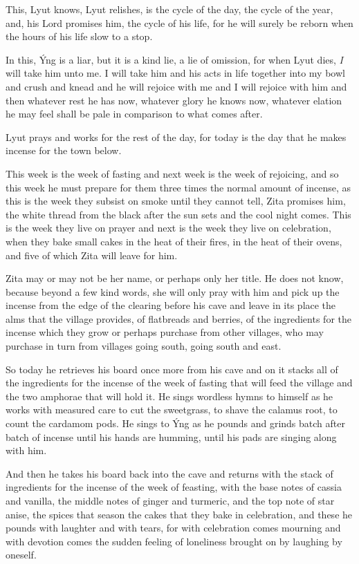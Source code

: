This, Lyut knows, Lyut relishes, is the cycle of the day, the cycle of the year, and, his Lord promises him, the cycle of his life, for he will surely be reborn when the hours of his life slow to a stop.

In this, Ýng is a liar, but it is a kind lie, a lie of omission, for when Lyut dies, \emph{I} will take him unto me. I will take him and his acts in life together into my bowl and crush and knead and he will rejoice with me and I will rejoice with him and then whatever rest he has now, whatever glory he knows now, whatever elation he may feel shall be pale in comparison to what comes after.

\secdiv

\noindent Lyut prays and works for the rest of the day, for today is the day that he makes incense for the town below.

This week is the week of fasting and next week is the week of rejoicing, and so this week he must prepare for them three times the normal amount of incense, as this is the week they subsist on smoke until they cannot tell, Zita promises him, the white thread from the black after the sun sets and the cool night comes. This is the week they live on prayer and next is the week they live on celebration, when they bake small cakes in the heat of their fires, in the heat of their ovens, and five of which Zita will leave for him.

Zita may or may not be her name, or perhaps only her title. He does not know, because beyond a few kind words, she will only pray with him and pick up the incense from the edge of the clearing before his cave and leave in its place the alms that the village provides, of flatbreads and berries, of the ingredients for the incense which they grow or perhaps purchase from other villages, who may purchase in turn from villages going south, going south and east.

So today he retrieves his board once more from his cave and on it stacks all of the ingredients for the incense of the week of fasting that will feed the village and the two amphorae that will hold it. He sings wordless hymns to himself as he works with measured care to cut the sweetgrass, to shave the calamus root, to count the cardamom pods. He sings to Ýng as he pounds and grinds batch after batch of incense until his hands are humming, until his pads are singing along with him.

And then he takes his board back into the cave and returns with the stack of ingredients for the incense of the week of feasting, with the base notes of cassia and vanilla, the middle notes of ginger and turmeric, and the top note of star anise, the spices that season the cakes that they bake in celebration, and these he pounds with laughter and with tears, for with celebration comes mourning and with devotion comes the sudden feeling of loneliness brought on by laughing by oneself.

